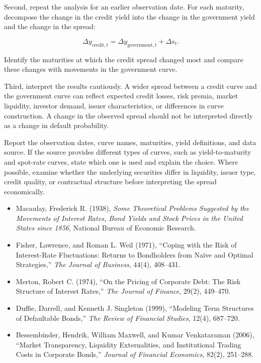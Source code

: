 Second, repeat the analysis for an earlier observation date. For each maturity, decompose the change in the credit yield into the change in the government yield and the change in the spread:

\[
\Delta y_{\mathrm{credit},t}
=
\Delta y_{\mathrm{government},t}
+
\Delta s_t.
\]

Identify the maturities at which the credit spread changed most and compare these changes with movements in the government curve.

Third, interpret the results cautiously. A wider spread between a credit curve and the government curve can reflect expected credit losses, risk premia, market liquidity, investor demand, issuer characteristics, or differences in curve construction. A change in the observed spread should not be interpreted directly as a change in default probability.

Report the observation dates, curve names, maturities, yield definitions, and data source. If the source provides different types of curves, such as yield-to-maturity and spot-rate curves, state which one is used and explain the choice. Where possible, examine whether the underlying securities differ in liquidity, issuer type, credit quality, or contractual structure before interpreting the spread economically.



\begin{itemize}

\item Macaulay, Frederick R. (1938),
\emph{Some Theoretical Problems Suggested by the Movements of Interest Rates, Bond Yields and Stock Prices in the United States since 1856},
National Bureau of Economic Research.

\item Fisher, Lawrence, and Roman L. Weil (1971),
``Coping with the Risk of Interest-Rate Fluctuations: Returns to Bondholders from Na\"ive and Optimal Strategies,''
\emph{The Journal of Business}, 44(4), 408--431.

\item Merton, Robert C. (1974),
``On the Pricing of Corporate Debt: The Risk Structure of Interest Rates,''
\emph{The Journal of Finance}, 29(2), 449--470.

\item Duffie, Darrell, and Kenneth J. Singleton (1999),
``Modeling Term Structures of Defaultable Bonds,''
\emph{The Review of Financial Studies}, 12(4), 687--720.

\item Bessembinder, Hendrik, William Maxwell, and Kumar Venkataraman (2006),
``Market Transparency, Liquidity Externalities, and Institutional Trading Costs in Corporate Bonds,''
\emph{Journal of Financial Economics}, 82(2), 251--288.

\end{itemize}

